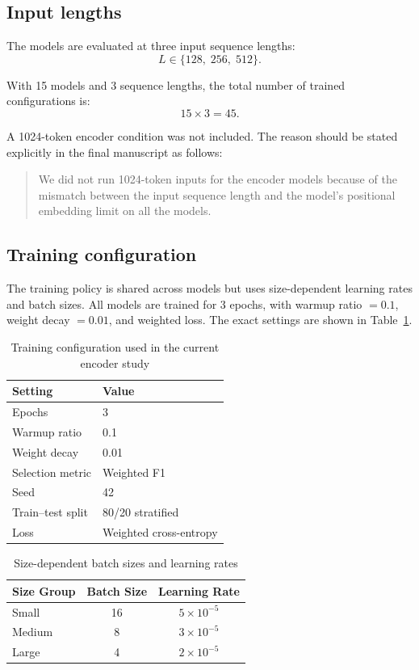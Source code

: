 \documentclass[11pt]{article}
\begin{document}
\subsection{Input lengths}

The models are evaluated at three input sequence lengths:
\[
L \in \{128,\;256,\;512\}.
\]

With 15 models and 3 sequence lengths, the total number of trained configurations is:
\[
15 \times 3 = 45.
\]

A 1024-token encoder condition was not included. The reason should be stated explicitly in the final manuscript as follows:

\begin{quote}
We did not run 1024-token inputs for the encoder models because of the mismatch between the input sequence length and the model's positional embedding limit on all the models.
\end{quote}

\subsection{Training configuration}

The training policy is shared across models but uses size-dependent learning rates and batch sizes. All models are trained for 3 epochs, with warmup ratio $=0.1$, weight decay $=0.01$, and weighted loss. The exact settings are shown in Table~\ref{tab:hyperparameters}.

\begin{table}[H]
\centering
\caption{Training configuration used in the current encoder study}
\label{tab:hyperparameters}
\begin{tabular}{ll}
\toprule
Setting & Value \\
\midrule
Epochs & 3 \\
Warmup ratio & 0.1 \\
Weight decay & 0.01 \\
Selection metric & Weighted F1 \\
Seed & 42 \\
Train--test split & 80/20 stratified \\
Loss & Weighted cross-entropy \\
\bottomrule
\end{tabular}
\end{table}

\begin{table}[H]
\centering
\caption{Size-dependent batch sizes and learning rates}
\label{tab:size-hyperparameters}
\begin{tabular}{lcc}
\toprule
Size Group & Batch Size & Learning Rate \\
\midrule
Small & 16 & $5 \times 10^{-5}$ \\
Medium & 8 & $3 \times 10^{-5}$ \\
Large & 4 & $2 \times 10^{-5}$ \\
\bottomrule
\end{tabular}
\end{table}
\end{document}
